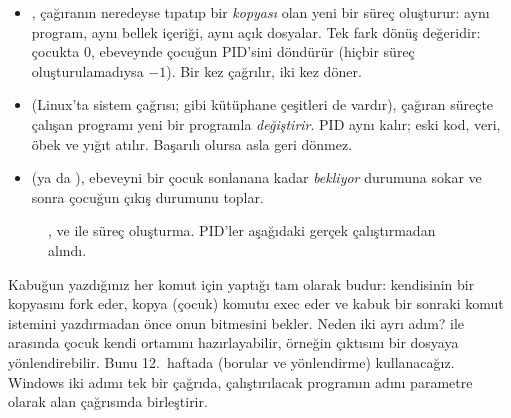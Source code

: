 \begin{itemize}
  \item {}, çağıranın neredeyse tıpatıp bir \emph{kopyası} olan yeni bir süreç oluşturur: aynı program, aynı bellek içeriği, aynı açık dosyalar. Tek fark dönüş değeridir:  çocukta $0$, ebeveynde çocuğun PID'sini döndürür (hiçbir süreç oluşturulamadıysa $-1$). Bir kez çağrılır, iki kez döner.
  \item {} (Linux'ta  sistem çağrısı;  gibi kütüphane çeşitleri de vardır), çağıran süreçte çalışan programı yeni bir programla \emph{değiştirir}. PID aynı kalır; eski kod, veri, öbek ve yığıt atılır. Başarılı olursa  asla geri dönmez.
  \item {} (ya da ), ebeveyni bir çocuk sonlanana kadar \emph{bekliyor} durumuna sokar ve sonra çocuğun çıkış durumunu toplar.
\end{itemize}

\begin{figure}[H]
\centering
{}
\caption{,  ve  ile süreç oluşturma. PID'ler aşağıdaki gerçek çalıştırmadan alındı.}
\end{figure}

Kabuğun yazdığınız her komut için yaptığı tam olarak budur: kendisinin bir kopyasını fork eder, kopya (çocuk) komutu exec eder ve kabuk bir sonraki komut istemini yazdırmadan önce onun bitmesini bekler. Neden iki ayrı adım?  ile  arasında çocuk kendi ortamını hazırlayabilir, örneğin çıktısını bir dosyaya yönlendirebilir. Bunu 12.~haftada (borular ve yönlendirme) kullanacağız. Windows iki adımı tek bir çağrıda, çalıştırılacak programın adını parametre olarak alan  çağrısında birleştirir.

